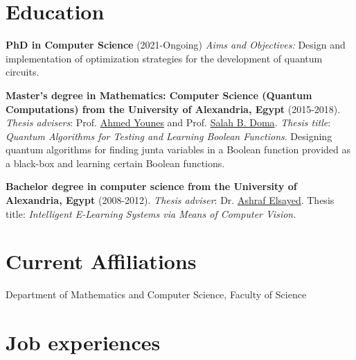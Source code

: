 \documentclass[margin,line]{resume}
\begin{document}
\begin{resume}

        
    \section{\mysidestyle Education} 
    \textbf{PhD in Computer Science} (2021-Ongoing)
     \emph{Aims and Objectives:} Design and implementation of optimization strategies for the development of quantum circuits.    

    \textbf{Master's degree in Mathematics: Computer Science (Quantum Computations) from the University of Alexandria, Egypt} (2015-2018). 
    \emph{Thesis advisers}: Prof.  \href{https://scholar.google.com.eg/citations?user=CZz2XFIAAAAJ&hl=en}{Ahmed Younes} and Prof. \href{https://scholar.google.com.eg/citations?hl=en&user=YFeMsegAAAAJ&view_op=list_works&sortby=pubdate}{Salah B. Doma}. 
     \emph{Thesis title}: \textit{Quantum Algorithms for Testing and Learning Boolean Functions}. Designing quantum algorithms for finding junta variables in a Boolean function provided as a black-box and learning certain Boolean functions.

    \textbf{Bachelor degree in computer science from the University of Alexandria, Egypt}
    (2008-2012).  \emph{Thesis adviser}: Dr. \href{https://scholar.google.com.eg/citations?hl=en&user=G9tQkdIAAAAJ&view_op=list_works&sortby=pubdate}{Ashraf Elsayed}.
    Thesis title: \textit{Intelligent E-Learning Systems via Means of Computer Vision.}
  

\section{\mysidestyle Current Affiliations}\vspace{1mm}
\begin{description}
    \item[Department of Mathematics and Computer Science, Faculty of Science] 
\end{description}


\section{\mysidestyle Job experiences}\vspace{1mm}
\begin{description}
    


\end{description}
\end{resume}
\end{document}
